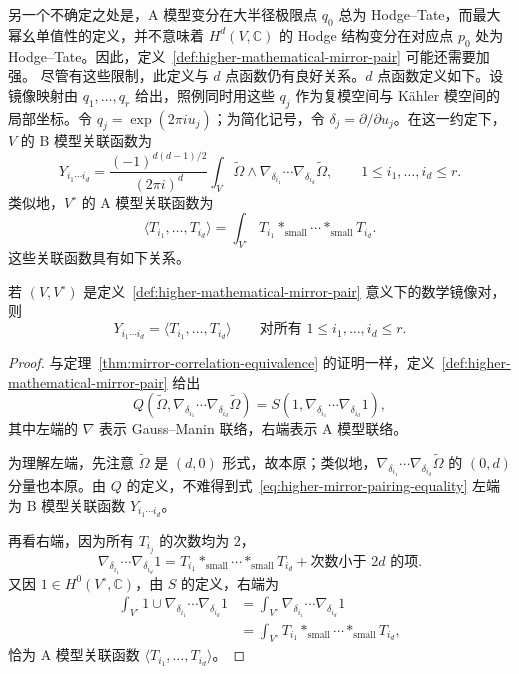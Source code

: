 另一个不确定之处是，A 模型变分在大半径极限点 $q_0$ 总为 Hodge--Tate，而最大幂幺单值性的定义，并不意味着 $H^d(V,\mathbb C)$ 的 Hodge 结构变分在对应点 $p_0$ 处为 Hodge--Tate。因此，定义~\ref{def:higher-mathematical-mirror-pair} 可能还需要加强。
尽管有这些限制，此定义与 $d$ 点函数仍有良好关系。$d$ 点函数定义如下。设镜像映射由 $q_1,\ldots,q_r$ 给出，照例同时用这些 $q_j$ 作为复模空间与 Kähler 模空间的局部坐标。令 $q_j=\exp(2\pi iu_j)$；为简化记号，令 $\delta_j=\partial/\partial u_j$。在这一约定下，$V$ 的 B 模型关联函数为
\[
Y_{i_1\cdots i_d}=\frac{(-1)^{d(d-1)/2}}{(2\pi i)^d}\int_V\widetilde\Omega\wedge\nabla_{\delta_{i_1}}\cdots\nabla_{\delta_{i_d}}\widetilde\Omega,
\qquad1\le i_1,\ldots,i_d\le r.
\]
类似地，$V^\circ$ 的 A 模型关联函数为
\[
\langle T_{i_1},\ldots,T_{i_d}\rangle=\int_{V^\circ}T_{i_1}*_{\mathrm{small}}\cdots*_{\mathrm{small}}T_{i_d}.
\]
这些关联函数具有如下关系。
\begin{proposition}\label{prop:higher-mirror-correlations}
若 $(V,V^\circ)$ 是定义~\ref{def:higher-mathematical-mirror-pair} 意义下的数学镜像对，则
\[
Y_{i_1\cdots i_d}=\langle T_{i_1},\ldots,T_{i_d}\rangle
\qquad\text{对所有 }1\le i_1,\ldots,i_d\le r.
\]
\end{proposition}
\begin{proof}
与定理~\ref{thm:mirror-correlation-equivalence} 的证明一样，定义~\ref{def:higher-mathematical-mirror-pair} 给出
\begin{equation}\label{eq:higher-mirror-pairing-equality}
Q(\widetilde\Omega,\nabla_{\delta_{i_1}}\cdots\nabla_{\delta_{i_d}}\widetilde\Omega)
=S(1,\nabla_{\delta_{i_1}}\cdots\nabla_{\delta_{i_d}}1),
\end{equation}
其中左端的 $\nabla$ 表示 Gauss--Manin 联络，右端表示 A 模型联络。

为理解左端，先注意 $\widetilde\Omega$ 是 $(d,0)$ 形式，故本原；类似地，$\nabla_{\delta_{i_1}}\cdots\nabla_{\delta_{i_d}}\widetilde\Omega$ 的 $(0,d)$ 分量也本原。由 $Q$ 的定义，不难得到式~\eqref{eq:higher-mirror-pairing-equality} 左端为 B 模型关联函数 $Y_{i_1\cdots i_d}$。

再看右端，因为所有 $T_{i_j}$ 的次数均为 $2$，
\[
\nabla_{\delta_{i_1}}\cdots\nabla_{\delta_{i_d}}1
=T_{i_1}*_{\mathrm{small}}\cdots*_{\mathrm{small}}T_{i_d}
+\text{次数小于 }2d\text{ 的项}.
\]
又因 $1\in H^0(V^\circ,\mathbb C)$，由 $S$ 的定义，右端为
\[
\begin{aligned}
\int_{V^\circ}1\cup\nabla_{\delta_{i_1}}\cdots\nabla_{\delta_{i_d}}1
&=\int_{V^\circ}\nabla_{\delta_{i_1}}\cdots\nabla_{\delta_{i_d}}1\\
&=\int_{V^\circ}T_{i_1}*_{\mathrm{small}}\cdots*_{\mathrm{small}}T_{i_d},
\end{aligned}
\]
恰为 A 模型关联函数 $\langle T_{i_1},\ldots,T_{i_d}\rangle$。
\end{proof}
